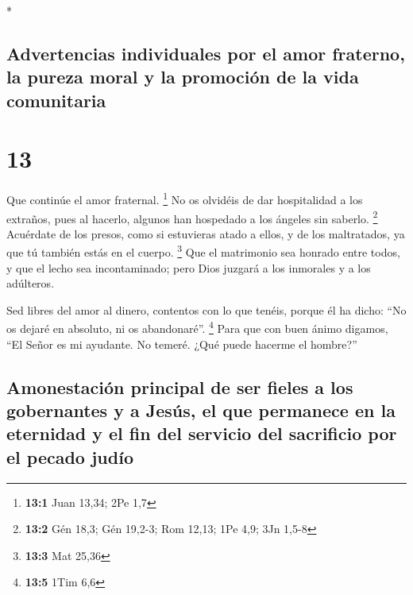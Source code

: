 \begin{paracol}{2}
\begin{otherlanguage}{english}
\end{otherlanguage}

\switchcolumn[0]*

\hypertarget{advertencias-individuales-por-el-amor-fraterno-la-pureza-moral-y-la-promociuxf3n-de-la-vida-comunitaria}{%
\subsection{Advertencias individuales por el amor fraterno, la pureza
moral y la promoción de la vida
comunitaria}\label{advertencias-individuales-por-el-amor-fraterno-la-pureza-moral-y-la-promociuxf3n-de-la-vida-comunitaria}}

\hypertarget{section-24}{%
\section{13}\label{section-24}}

 Que continúe el amor fraternal. \footnote{\textbf{13:1}
  Juan 13,34; 2Pe 1,7}  No os olvidéis de dar hospitalidad
a los extraños, pues al hacerlo, algunos han hospedado a los ángeles sin
saberlo. \footnote{\textbf{13:2} Gén 18,3; Gén 19,2-3; Rom 12,13; 1Pe
  4,9; 3Jn 1,5-8}  Acuérdate de los presos, como si
estuvieras atado a ellos, y de los maltratados, ya que tú también estás
en el cuerpo. \footnote{\textbf{13:3} Mat 25,36}  Que el
matrimonio sea honrado entre todos, y que el lecho sea incontaminado;
pero Dios juzgará a los inmorales y a los adúlteros.

 Sed libres del amor al dinero, contentos con lo que
tenéis, porque él ha dicho: ``No os dejaré en absoluto, ni os
abandonaré''. \footnote{\textbf{13:5} 1Tim 6,6}  Para que
con buen ánimo digamos, ``El Señor es mi ayudante. No temeré. ¿Qué puede
hacerme el hombre?''

\hypertarget{amonestaciuxf3n-principal-de-ser-fieles-a-los-gobernantes-y-a-jesuxfas-el-que-permanece-en-la-eternidad-y-el-fin-del-servicio-del-sacrificio-por-el-pecado-juduxedo}{%
\subsection{Amonestación principal de ser fieles a los gobernantes y a
Jesús, el que permanece en la eternidad y el fin del servicio del
sacrificio por el pecado
judío}\label{amonestaciuxf3n-principal-de-ser-fieles-a-los-gobernantes-y-a-jesuxfas-el-que-permanece-en-la-eternidad-y-el-fin-del-servicio-del-sacrificio-por-el-pecado-juduxedo}}


\end{paracol}
